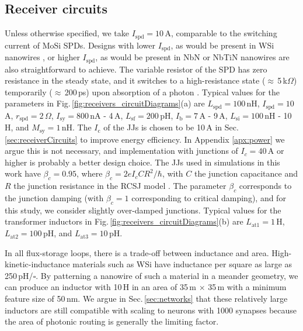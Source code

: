 \documentclass[twocolumn]{article}
\begin{document}
\subsection{Receiver circuits}
Unless otherwise specified, we take $I_{\mathrm{spd}} = 10$\,\textmu A, comparable to the switching current of MoSi \cite{veko2015} SPDs. Designs with lower $I_{\mathrm{spd}}$, as would be present in WSi nanowires \cite{mave2013}, or higher $I_{\mathrm{spd}}$, as would be present in NbN \cite{gook2001} or NbTiN \cite{miya2013} nanowires are also straightforward to achieve. The variable resistor of the SPD has zero resistance in the steady state, and it switches to a high-resistance state ($\approx$\,5\,k$\Omega$) temporarily ($\approx$\,200\,ps) upon absorption of a photon \cite{yake2007}. Typical values for the parameters in Fig.\,\ref{fig:receivers_circuitDiagrams}(a) are $L_{\mathrm{spd}} = 100$\,nH, $I_{\mathrm{spd}} = 10$\,\textmu A, $r_{\mathrm{spd}} = 2$\,$\Omega$, $I_{\mathrm{sy}} = 800$\,nA -  4\,\textmu A, $L_{\mathrm{sf}} = 200$\,pH, $I_{\mathrm{b}} = 7$\,\textmu A - 9\,\textmu A, $L_{\mathrm{si}} = 100$\,nH - 10\,\textmu H, and $M_{\mathrm{sy}} = 1$\,nH. The $I_{\mathrm{c}}$ of the JJs is chosen to be 10\,\textmu A in Sec.\,\ref{sec:receiverCircuits} to improve energy efficiency. In Appendix \ref{apx:power} we argue this is not necessary, and implementation with junctions of $I_c = 40$\,\textmu A or higher is probably a better design choice. The JJs used in simulations in this work have $\beta_c = 0.95$, where $\beta_c = 2eI_cCR^2/\hbar$, with $C$ the junction capacitance and $R$ the junction resistance in the RCSJ model \cite{vatu1998,ka1999}. The parameter $\beta_c$ corresponds to the junction damping (with $\beta_c = 1$ corresponding to critical damping), and for this study, we consider slightly over-damped junctions. Typical values for the transformer inductors in Fig.\,\ref{fig:receivers_circuitDiagrams}(b) are $L_{\mathrm{at1}} = 1$\,\textmu H, $L_{\mathrm{at2}} = 100$\,pH, and $L_{\mathrm{at3}} = 10$\,pH.

In all flux-storage loops, there is a trade-off between inductance and area. High-kinetic-inductance materials such as WSi have inductance per square as large as 250\,pH/$\square$. By patterning a nanowire of such a material in a meander geometry, we can produce an inductor with 10\,\textmu H in an area of 35\,\textmu m $\times$ 35\,\textmu m with a minimum feature size of 50\,nm. We argue in Sec.\,\ref{sec:networks} that these relatively large inductors are still compatible with scaling to neurons with 1000 synapses because the area of photonic routing is generally the limiting factor.
\end{document}
